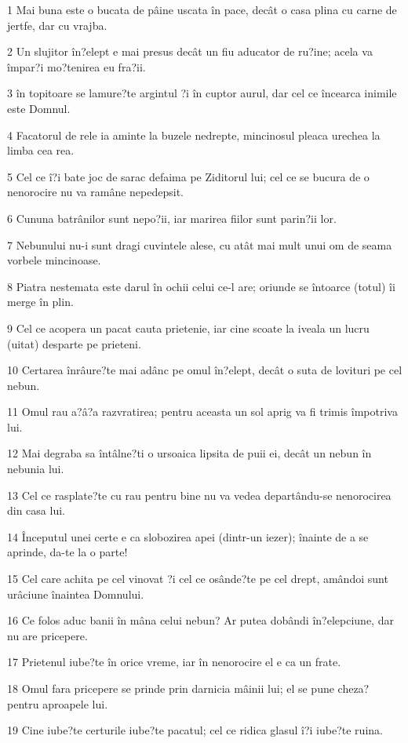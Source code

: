 \par 1 Mai buna este o bucata de pâine uscata în pace, decât o casa plina cu carne de jertfe, dar cu vrajba.
\par 2 Un slujitor în?elept e mai presus decât un fiu aducator de ru?ine; acela va împar?i mo?tenirea eu fra?ii.
\par 3 în topitoare se lamure?te argintul ?i în cuptor aurul, dar cel ce încearca inimile este Domnul.
\par 4 Facatorul de rele ia aminte la buzele nedrepte, mincinosul pleaca urechea la limba cea rea.
\par 5 Cel ce î?i bate joc de sarac defaima pe Ziditorul lui; cel ce se bucura de o nenorocire nu va ramâne nepedepsit.
\par 6 Cununa batrânilor sunt nepo?ii, iar marirea fiilor sunt parin?ii lor.
\par 7 Nebunului nu-i sunt dragi cuvintele alese, cu atât mai mult unui om de seama vorbele mincinoase.
\par 8 Piatra nestemata este darul în ochii celui ce-l are; oriunde se întoarce (totul) îi merge în plin.
\par 9 Cel ce acopera un pacat cauta prietenie, iar cine scoate la iveala un lucru (uitat) desparte pe prieteni.
\par 10 Certarea înrâure?te mai adânc pe omul în?elept, decât o suta de lovituri pe cel nebun.
\par 11 Omul rau a?â?a razvratirea; pentru aceasta un sol aprig va fi trimis împotriva lui.
\par 12 Mai degraba sa întâlne?ti o ursoaica lipsita de puii ei, decât un nebun în nebunia lui.
\par 13 Cel ce rasplate?te cu rau pentru bine nu va vedea departându-se nenorocirea din casa lui.
\par 14 Începutul unei certe e ca slobozirea apei (dintr-un iezer); înainte de a se aprinde, da-te la o parte!
\par 15 Cel care achita pe cel vinovat ?i cel ce osânde?te pe cel drept, amândoi sunt urâciune înaintea Domnului.
\par 16 Ce folos aduc banii în mâna celui nebun? Ar putea dobândi în?elepciune, dar nu are pricepere.
\par 17 Prietenul iube?te în orice vreme, iar în nenorocire el e ca un frate.
\par 18 Omul fara pricepere se prinde prin darnicia mâinii lui; el se pune cheza? pentru aproapele lui.
\par 19 Cine iube?te certurile iube?te pacatul; cel ce ridica glasul î?i iube?te ruina.
